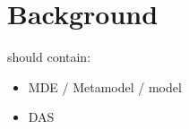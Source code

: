 \section{Background}

should contain:
\begin{itemize}
	\item MDE / Metamodel / model
	\item DAS
\end{itemize}
